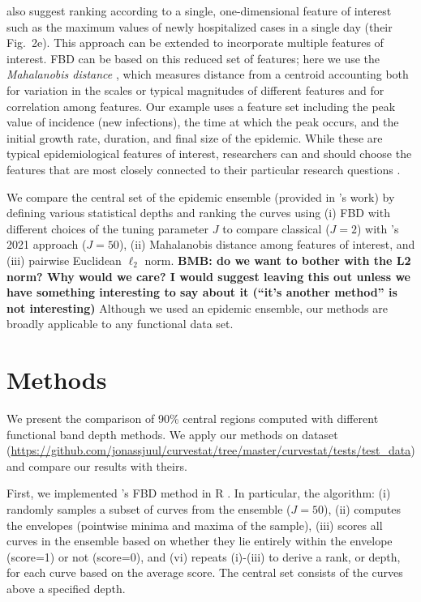 \documentclass[fleqn,10pt,lineno]{wlpeerj}
\begin{document}
\juul also suggest ranking according to a single, one-dimensional feature of interest such as the maximum values of newly hospitalized cases in a single day (their Fig.~2e). This approach can be extended to incorporate multiple features of interest. FBD can be based on this reduced set of features; here we use the \emph{Mahalanobis distance} \citep{mahalanobis1936generalized}, which measures distance from a centroid accounting both for variation in the scales or typical magnitudes of different features and for correlation among features. Our example uses a feature set including the peak value of incidence (new infections), the time at which the peak occurs, and the initial growth rate, duration, and final size of the epidemic. While these are typical epidemiological features of interest, researchers can and should choose the features that are most closely connected to their particular research questions \citep{probert2016decision}.

We compare the central set of the epidemic ensemble (provided in \juul's work) by defining various statistical depths and ranking the curves using (i) FBD with different choices of the tuning parameter $J$ to compare classical ($J=2$) with \juul's 2021 approach ($J=50$), (ii) Mahalanobis distance among features of interest, and (iii) pairwise Euclidean $\ell_2$ norm.
\textbf{BMB: do we want to bother with the L2 norm? Why would we care? I would suggest leaving this out unless we have something interesting to say about it (``it's another method'' is not interesting)}
Although we used an epidemic ensemble, our methods are broadly applicable to any functional data set.

\section*{Methods}

We present the comparison of 90\% central regions computed with different functional band depth methods. We apply our methods on \juul dataset (\url{https://github.com/jonassjuul/curvestat/tree/master/curvestat/tests/test_data}) and compare our results with theirs.

First, we implemented \juul's FBD method in R \citep{R}. In particular, the algorithm: (i) randomly samples a subset of curves from the ensemble ($J=50$), (ii) computes the envelopes (pointwise minima and maxima of the sample), (iii) scores all curves in the ensemble based on whether they lie entirely within the envelope (score=1) or not (score=0), and (vi) repeats (i)-(iii) to derive a rank, or depth, for each curve based on the average score. The central set consists of the curves above a specified depth.
\end{document}
